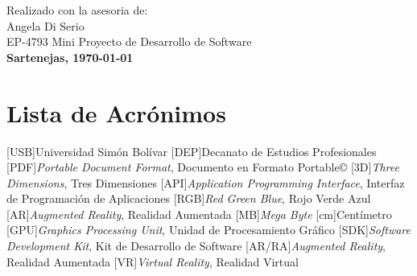 \begin{titlepage}
Realizado con la asesoria de:\\
Angela Di Serio\\[1cm]

EP-4793 Mini Proyecto de Desarrollo de Software\\[1cm]


{\bfseries Sartenejas, \today}\\[2cm] %


 

\vfill %

\end{titlepage}

%

\tableofcontents
\listoffigures

\chapter*{Lista de Acrónimos}
\begin{acronym}
	[USB]{Universidad Sim\'on Bol\'ivar}
	[DEP]{Decanato de Estudios Profesionales}
	[PDF]{\textit{Portable Document Format}, Documento en Formato Portable\copyright}
	[3D]{\textit{Three Dimensions}, Tres Dimensiones}
	[API]{\textit{Application Programming Interface}, Interfaz de Programación de Aplicaciones}
	[RGB]{\textit{Red Green Blue}, Rojo Verde Azul}
	[AR]{\textit{Augmented Reality}, Realidad Aumentada}
	[MB]{\textit{Mega Byte}}
	[cm]{Centímetro}
	[GPU]{\textit{Graphics Processing Unit}, Unidad de Procesamiento Gráfico}
	[SDK]{\textit{Software Development Kit}, Kit de Desarrollo de Software}
	[AR/RA]{\textit{Augmented Reality}, Realidad Aumentada}
	[VR]{\textit{Virtual Reality}, Realidad Virtual}

\end{acronym}
\cleardoublepage
{}
\clearpage

